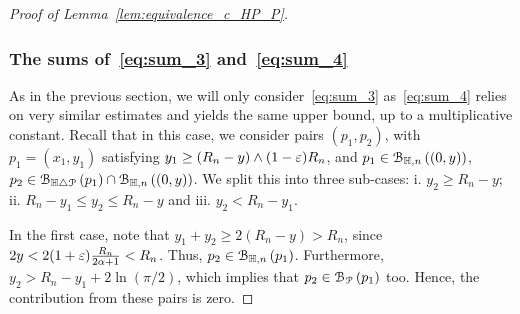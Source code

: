 \begin{proof}[Proof of Lemma~\ref{lem:equivalence_c_HP_P}]
\subsubsection{The sums of~\eqref{eq:sum_3} and~\eqref{eq:sum_4}}

As in the previous section, we will only consider~\eqref{eq:sum_3} as~\eqref{eq:sum_4} relies on very similar estimates 
and yields the same upper bound, up to a multiplicative constant. 
Recall that in this case, we consider pairs $(p_1,p_2)$, with $p_1 = (x_1,y_1)$ satisfying 
$y_1 \geq (R_n - y) \wedge (1-\varepsilon)R_n$, and $p_1 \in {\mathcal B}_{\mathbb{H},n}\left((0,y)\right)$, $p_2 \in {\mathcal B}_{\mathbb{H} \bigtriangleup {\mathcal P}}\left(p_1\right) \cap {\mathcal B}_{\mathbb{H},n}\left((0,y)\right)$. 
We split this into three sub-cases:  i. $y_2 \geq R_n - y$; ii. $R_n -y_1 \leq y_2 \leq R_n -y$ and iii. $y_2 < R_n - y_1$.  

In the first case, note that $y_1 + y_2 \geq 2(R_n - y) > R_n$, since $2y < 2(1+\varepsilon)
\frac{R_n}{2\alpha +1} < R_n$. Thus, $p_2 \in {\mathcal B}_{\mathbb{H},n}\left(p_1\right)$. Furthermore, 
$y_2 > R_n - y_1 + 2\ln (\pi/2)$, which implies that $p_2 \in {\mathcal B}_{{\mathcal P}}\left(p_1\right)$ too. 
Hence, the contribution from these pairs is zero.   


\end{proof}
